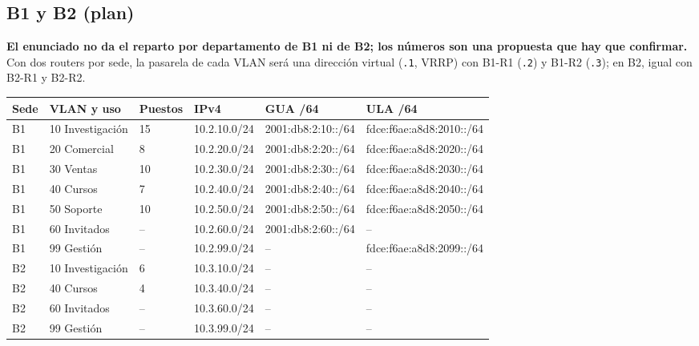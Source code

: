 \documentclass[11pt,a4paper]{article}
\newcommand{\cod}[1]{\texttt{#1}}
\begin{document}
\subsection{B1 y B2 (plan)}
\textbf{El enunciado no da el reparto por departamento de B1 ni de B2; los números son una propuesta que hay que confirmar.} Con dos routers por sede, la pasarela de cada VLAN será una dirección virtual (\cod{.1}, VRRP) con B1-R1 (\cod{.2}) y B1-R2 (\cod{.3}); en B2, igual con B2-R1 y B2-R2.
\begingroup\footnotesize
\begin{longtable}{@{}p{1.1cm}p{2.6cm}p{1.2cm}p{2.3cm}p{3.3cm}p{4cm}@{}}
\toprule
\textbf{Sede} & \textbf{VLAN y uso} & \textbf{Puestos} & \textbf{IPv4} & \textbf{GUA /64} & \textbf{ULA /64}\\
\midrule
\endhead
B1 & 10 Investigación & 15 & 10.2.10.0/24 & 2001:db8:2:10::/64 & fdce:f6ae:a8d8:2010::/64\\
B1 & 20 Comercial & 8 & 10.2.20.0/24 & 2001:db8:2:20::/64 & fdce:f6ae:a8d8:2020::/64\\
B1 & 30 Ventas & 10 & 10.2.30.0/24 & 2001:db8:2:30::/64 & fdce:f6ae:a8d8:2030::/64\\
B1 & 40 Cursos & 7 & 10.2.40.0/24 & 2001:db8:2:40::/64 & fdce:f6ae:a8d8:2040::/64\\
B1 & 50 Soporte & 10 & 10.2.50.0/24 & 2001:db8:2:50::/64 & fdce:f6ae:a8d8:2050::/64\\
B1 & 60 Invitados & -- & 10.2.60.0/24 & 2001:db8:2:60::/64 & --\\
B1 & 99 Gestión & -- & 10.2.99.0/24 & -- & fdce:f6ae:a8d8:2099::/64\\
B2 & 10 Investigación & 6 & 10.3.10.0/24 & -- & --\\
B2 & 40 Cursos & 4 & 10.3.40.0/24 & -- & --\\
B2 & 60 Invitados & -- & 10.3.60.0/24 & -- & --\\
B2 & 99 Gestión & -- & 10.3.99.0/24 & -- & --\\
\bottomrule
\end{longtable}
\endgroup
\end{document}
